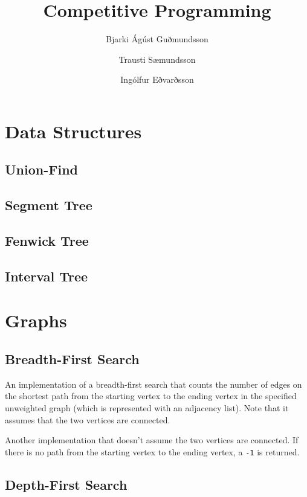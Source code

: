 \documentclass[11pt,a4paper,titlepage]{article}
\title{Competitive Programming}
\author{Bjarki Ágúst Guðmundsson \and Trausti Sæmundsson \and Ingólfur Eðvarðsson}
\begin{document}
	\maketitle
	\tableofcontents
	\newpage

	\section{Data Structures}

		\subsection{Union-Find}
			

		\subsection{Segment Tree}
		\subsection{Fenwick Tree}
		\subsection{Interval Tree}

	\section{Graphs}

		\subsection{Breadth-First Search}

			An implementation of a breadth-first search that counts the number of edges on the shortest path from the starting vertex to the ending vertex in the specified unweighted graph (which is represented with an adjacency list). Note that it assumes that the two vertices are connected.
			

			Another implementation that doesn't assume the two vertices are connected. If there is no path from the starting vertex to the ending vertex, a \lstinline$-1$ is returned.
			

		\subsection{Depth-First Search}
\end{document}

